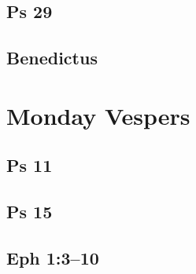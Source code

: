 \subsection{Ps 29}

{%
\parindent 0pt
\noindent
\ifx\preLilyPondExample \undefined
\else
  \expandafter\preLilyPondExample
\fi
\def\lilypondbook{}%

\ifx\postLilyPondExample \undefined
\else
  \expandafter\postLilyPondExample
\fi
}

\subsection{Benedictus}

{%
\parindent 0pt
\noindent
\ifx\preLilyPondExample \undefined
\else
  \expandafter\preLilyPondExample
\fi
\def\lilypondbook{}%

\ifx\postLilyPondExample \undefined
\else
  \expandafter\postLilyPondExample
\fi
}


\section{Monday Vespers}

\subsection{Ps 11}

{%
\parindent 0pt
\noindent
\ifx\preLilyPondExample \undefined
\else
  \expandafter\preLilyPondExample
\fi
\def\lilypondbook{}%

\ifx\postLilyPondExample \undefined
\else
  \expandafter\postLilyPondExample
\fi
}

\subsection{Ps 15}

{%
\parindent 0pt
\noindent
\ifx\preLilyPondExample \undefined
\else
  \expandafter\preLilyPondExample
\fi
\def\lilypondbook{}%

\ifx\postLilyPondExample \undefined
\else
  \expandafter\postLilyPondExample
\fi
}

\subsection{Eph 1:3--10}

{%
\parindent 0pt
\noindent
\ifx\preLilyPondExample \undefined
\else
  \expandafter\preLilyPondExample
\fi
\def\lilypondbook{}%

\ifx\postLilyPondExample \undefined
\else
  \expandafter\postLilyPondExample
\fi
}

